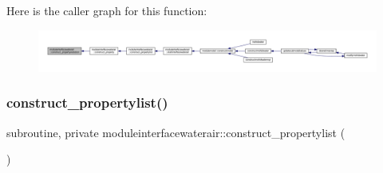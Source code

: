 Here is the caller graph for this function\+:\nopagebreak
\begin{figure}[H]
\begin{center}
\leavevmode
\includegraphics[width=350pt]{namespacemoduleinterfacewaterair_a49127aa503109a2b4f86aee6e0d4d665_icgraph}
\end{center}
\end{figure}
\mbox{\label{namespacemoduleinterfacewaterair_a0102df656b49a2adcbef76f5a3a9e6d0}} 
\subsubsection{\texorpdfstring{construct\+\_\+propertylist()}{construct\_propertylist()}}
{\footnotesize\ttfamily subroutine, private moduleinterfacewaterair\+::construct\+\_\+propertylist (\begin{DoxyParamCaption}{ }\end{DoxyParamCaption})\hspace{0.3cm}{\ttfamily [private]}}

